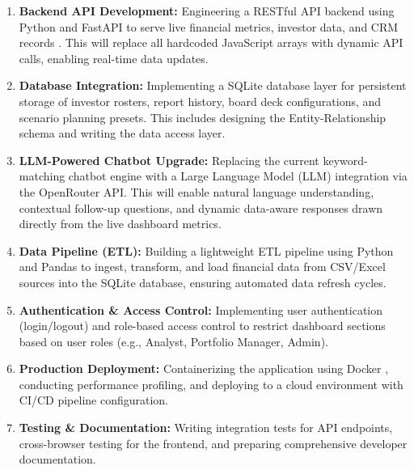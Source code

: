 \documentclass{book}
\begin{document}
\begin{enumerate}
    \item \textbf{Backend API Development:} Engineering a RESTful API backend using Python and FastAPI \cite{fastapi2024} to serve live financial metrics, investor data, and CRM records \cite{fielding2000rest}. This will replace all hardcoded JavaScript arrays with dynamic API calls, enabling real-time data updates.
    \item \textbf{Database Integration:} Implementing a SQLite \cite{sqlite2024} database layer for persistent storage of investor rosters, report history, board deck configurations, and scenario planning presets. This includes designing the Entity-Relationship schema and writing the data access layer.
    \item \textbf{LLM-Powered Chatbot Upgrade:} Replacing the current keyword-matching chatbot engine with a Large Language Model (LLM) integration via the OpenRouter API. This will enable natural language understanding, contextual follow-up questions, and dynamic data-aware responses drawn directly from the live dashboard metrics.
    \item \textbf{Data Pipeline (ETL):} Building a lightweight ETL pipeline using Python and Pandas to ingest, transform, and load financial data from CSV/Excel sources into the SQLite database, ensuring automated data refresh cycles.
    \item \textbf{Authentication \& Access Control:} Implementing user authentication (login/logout) and role-based access control to restrict dashboard sections based on user roles (e.g., Analyst, Portfolio Manager, Admin).
    \item \textbf{Production Deployment:} Containerizing the application using Docker \cite{docker2024}, conducting performance profiling, and deploying to a cloud environment with CI/CD pipeline configuration.
    \item \textbf{Testing \& Documentation:} Writing integration tests for API endpoints, cross-browser testing for the frontend, and preparing comprehensive developer documentation.
\end{enumerate}
\end{document}
